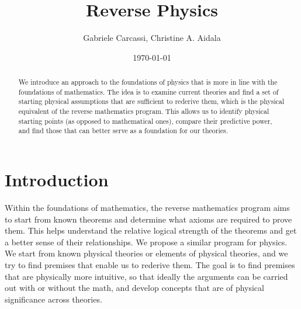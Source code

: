 \documentclass[10pt,twocolumn, nofootinbib]{revtex4-2}
\begin{document}
\title{Reverse Physics}
\author{Gabriele Carcassi, Christine A. Aidala}

\date{\today}


\begin{abstract}
We introduce an approach to the foundations of physics that is more in line with the foundations of mathematics. The idea is to examine current theories and find a set of starting physical assumptions that are sufficient to rederive them, which is the physical equivalent of the reverse mathematics program. This allows us to identify physical starting points (as opposed to mathematical ones), compare their predictive power, and find those that can better serve as a foundation for our theories.
\end{abstract}

\maketitle

\section{Introduction}

%	

Within the foundations of mathematics, the reverse mathematics program aims to start from known theorems and determine what axioms are required to prove them. This helps understand the relative logical strength of the theorems and get a better sense of their relationships. We propose a similar program for physics. We start from known physical theories or elements of physical theories, and we try to find premises that enable us to rederive them. The goal is to find premises that are physically more intuitive, so that ideally the arguments can be carried out with or without the math, and develop concepts that are of physical significance across theories.
\end{document}
